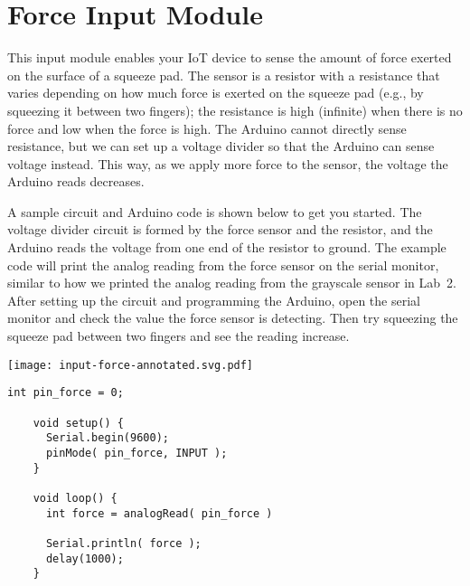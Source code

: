 
\clearpage
\section{Force Input Module}
\label{sec-input-force}

This input module enables your IoT device to sense the amount of force
exerted on the surface of a squeeze pad. The sensor is a resistor with a
resistance that varies depending on how much force is exerted on the
squeeze pad (e.g., by squeezing it between two fingers); the resistance
is high (infinite) when there is no force and low when the force is
high. The Arduino cannot directly sense resistance, but we can set up a
voltage divider so that the Arduino can sense voltage instead. This way,
as we apply more force to the sensor, the voltage the Arduino reads
decreases.


A sample circuit and Arduino code is shown below to get you started.
The voltage divider circuit is formed by the force sensor and the
 resistor, and the Arduino reads the voltage from one end
of the resistor to ground. The example code will print the analog
reading from the force sensor on the serial monitor, similar to how we
printed the analog reading from the grayscale sensor in Lab~2. After
setting up the circuit and programming the Arduino, open the serial
monitor and check the value the force sensor is detecting. Then try
squeezing the squeeze pad between two fingers and see the reading
increase.

\vspace{0.1in}
\begin{minipage}[t]{0.49\tw}
  \vspace{0pt}

  \texttt{[image: input-force-annotated.svg.pdf]}
\end{minipage}
\hfill
\begin{minipage}[t]{0.49\tw}
  \vspace{0.1in}
  \begin{Verbatim}[gobble=3,fontsize=\small]
    int pin_force = 0;

    void setup() {
      Serial.begin(9600);
      pinMode( pin_force, INPUT );
    }

    void loop() {
      int force = analogRead( pin_force )

      Serial.println( force );
      delay(1000);
    }
  \end{Verbatim}
\end{minipage}
\vspace{0.1in}

